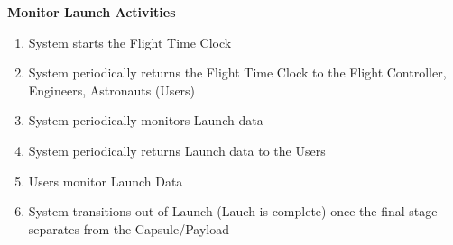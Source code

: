 \documentclass[letterpaper]{article}
\begin{document}
\noindent
\textbf{Monitor Launch Activities}
\begin{enumerate}
\item System starts the Flight Time Clock
\item System periodically returns the Flight Time Clock to the
Flight Controller, Engineers, Astronauts (Users)
\item System periodically monitors Launch data
\item System periodically returns Launch data to the Users
\item Users monitor Launch Data
\item System transitions out of Launch (Lauch is complete) once the
final stage separates from the Capsule/Payload
\end{enumerate}
\end{document}
